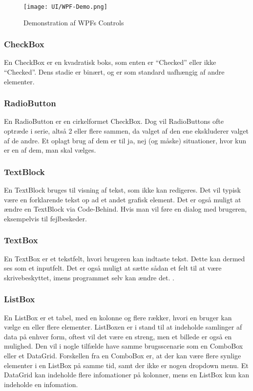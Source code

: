 \begin{wrapfigure}[22]{R}{0.5\textwidth}
    \label{img:wpfdemo}
    \vspace{-30pt}
    \begin{center}
        \texttt{[image: UI/WPF-Demo.png]}
    \end{center}
    \vspace{-15pt}
    \caption{Demonstration af WPFs Controls}
    \vspace{-15pt}
\end{wrapfigure}

\subsubsection*{CheckBox}
En CheckBox er en kvadratisk boks, som enten er ``Checked'' eller ikke ``Checked''. 
Dens stadie er binært, og er som standard uafhængig af andre elementer.

\subsubsection*{RadioButton}
En RadioButton er en cirkelformet CheckBox.
Dog vil RadioButtons ofte optræde i serie, altså 2 eller flere sammen, da valget af den ene ekskluderer valget af de andre. 
Et oplagt brug af dem er til ja, nej (og måske) situationer, hvor kun er en af dem, man skal vælges.

\subsubsection*{TextBlock}
En TextBlock bruges til visning af tekst, som ikke kan redigeres.
Det vil typisk være en forklarende tekst op ad et andet grafisk element.
Det er også muligt at ændre en TextBlock via Code-Behind. 
Hvis man vil føre en dialog med brugeren, eksempelvis til fejlbeskeder.

\subsubsection*{TextBox}
En TextBox er et tekstfelt, hvori brugeren kan indtaste tekst. 
Dette kan dermed ses som et inputfelt. 
Det er også muligt at sætte sådan et felt til at være skrivebeskyttet, imens programmet selv kan ændre det. .

\subsubsection*{ListBox}
En ListBox er et tabel, med en kolonne og flere rækker, hvori en bruger kan vælge en eller flere elementer.
ListBoxen er i stand til at indeholde samlinger af data på enhver form, oftest vil det være en streng, men et billede er også en mulighed.
Den vil i nogle tilfælde have samme brugsscenarie som en ComboBox eller et DataGrid. 
Forskellen fra en ComboBox er, at der kan være flere synlige elementer i en ListBox på samme tid, samt der ikke er nogen dropdown menu.
Et DataGrid kan indeholde flere infomationer på kolonner, mens en ListBox kun kan indeholde en infomation.

